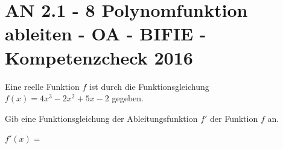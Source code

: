 \section{AN 2.1 - 8 Polynomfunktion ableiten - OA - BIFIE - Kompetenzcheck 2016}

\begin{beispiel}[AN 2.1]{1} %
				Eine reelle Funktion $f$ ist durch die Funktionsgleichung $f(x)=4x^{3}-2x^2+5x-2$ gegeben.

Gib eine Funktionsgleichung der Ableitungsfunktion $f'$ der Funktion $f$ an.

$f'(x)=$\,

\end{beispiel}	